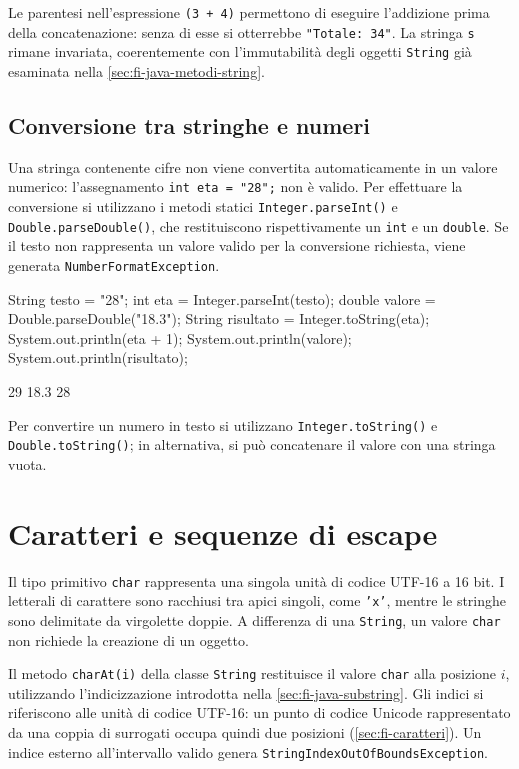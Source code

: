 Le parentesi nell'espressione \texttt{(3 + 4)}
permettono di eseguire l'addizione prima della
concatenazione: senza di esse si otterrebbe
\texttt{"Totale: 34"}. La stringa \texttt{s}
rimane invariata, coerentemente con
l'immutabilità degli oggetti \texttt{String}
già esaminata nella \cref{sec:fi-java-metodi-string}.

\subsection{Conversione tra stringhe e numeri}
\label{sec:fi-java-parsing}

Una stringa contenente cifre non viene convertita
automaticamente in un valore numerico: l'assegnamento
\texttt{int eta = "28";} non è valido.
Per effettuare la conversione si utilizzano
i metodi statici \texttt{Integer.parseInt()}
e \texttt{Double.parseDouble()}, che restituiscono
rispettivamente un \texttt{int} e un \texttt{double}.
Se il testo non rappresenta un valore valido
per la conversione richiesta, viene generata
\texttt{NumberFormatException}.

\begin{unipdcode}[language=Java]
String testo = "28";
int eta = Integer.parseInt(testo);
double valore = Double.parseDouble("18.3");
String risultato = Integer.toString(eta);
System.out.println(eta + 1);
System.out.println(valore);
System.out.println(risultato);
\end{unipdcode}

\begin{unipdterminal}
29
18.3
28
\end{unipdterminal}

Per convertire un numero in testo si utilizzano
\texttt{Integer.toString()} e
\texttt{Double.toString()}; in alternativa,
si può concatenare il valore con una stringa vuota.

\section{Caratteri e sequenze di escape}
\label{sec:fi-java-char-escape}

Il tipo primitivo \texttt{char} rappresenta una singola
unità di codice UTF-16 a 16 bit. I letterali di carattere
sono racchiusi tra apici singoli, come \texttt{'x'},
mentre le stringhe sono delimitate da virgolette doppie.
A differenza di una \texttt{String}, un valore
\texttt{char} non richiede la creazione di un oggetto.

Il metodo \texttt{charAt(i)} della classe \texttt{String}
restituisce il valore \texttt{char} alla posizione \(i\),
utilizzando l'indicizzazione introdotta nella
\cref{sec:fi-java-substring}. Gli indici si riferiscono
alle unità di codice UTF-16: un punto di codice Unicode
rappresentato da una coppia di surrogati occupa quindi
due posizioni (\cref{sec:fi-caratteri}).
Un indice esterno all'intervallo valido genera
\texttt{StringIndexOutOfBoundsException}.


